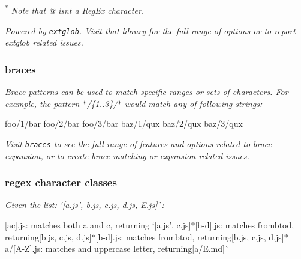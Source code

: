 {\itshape \textsuperscript{{\bfseries $\ast$}} Note that {\ttfamily @} isn\textquotesingle{}t a Reg\+Ex character.}

{\itshape Powered by \href{https://github.com/micromatch/extglob}{\tt extglob}. Visit that library for the full range of options or to report extglob related issues.}

{\itshape \subsubsection*{braces}}

{\itshape }

{\itshape Brace patterns can be used to match specific ranges or sets of characters. For example, the pattern {\ttfamily $\ast$/\{1..3\}/$\ast$} would match any of following strings\+:}

{\itshape 
\begin{DoxyCode}
foo/1/bar
foo/2/bar
foo/3/bar
baz/1/qux
baz/2/qux
baz/3/qux
\end{DoxyCode}
}

{\itshape Visit \href{https://github.com/micromatch/braces}{\tt braces} to see the full range of features and options related to brace expansion, or to create brace matching or expansion related issues.}

{\itshape \subsubsection*{regex character classes}}

{\itshape }

{\itshape Given the list\+: `\mbox{[}\textquotesingle{}a.\+js', \textquotesingle{}b.\+js\textquotesingle{}, \textquotesingle{}c.\+js\textquotesingle{}, \textquotesingle{}d.\+js\textquotesingle{}, \textquotesingle{}E.\+js\textquotesingle{}\mbox{]}\`{}\+:}

{\itshape 
\begin{DoxyItemize}
\item {\ttfamily \mbox{[}ac\mbox{]}.js}\+: matches both {\ttfamily a} and {\ttfamily c}, returning `\mbox{[}\textquotesingle{}a.\+js', \textquotesingle{}c.\+js\textquotesingle{}\mbox{]}{\ttfamily  $\ast$}\mbox{[}b-\/d\mbox{]}.js{\ttfamily \+: matches from}b{\ttfamily to}d{\ttfamily , returning}\mbox{[}\textquotesingle{}b.\+js\textquotesingle{}, \textquotesingle{}c.\+js\textquotesingle{}, \textquotesingle{}d.\+js\textquotesingle{}\mbox{]}{\ttfamily  $\ast$}\mbox{[}b-\/d\mbox{]}.js{\ttfamily \+: matches from}b{\ttfamily to}d{\ttfamily , returning}\mbox{[}\textquotesingle{}b.\+js\textquotesingle{}, \textquotesingle{}c.\+js\textquotesingle{}, \textquotesingle{}d.\+js\textquotesingle{}\mbox{]}{\ttfamily  $\ast$}a/\mbox{[}A-\/Z\mbox{]}.js{\ttfamily \+: matches and uppercase letter, returning}\mbox{[}\textquotesingle{}a/\+E.\+md\textquotesingle{}\mbox{]}\`{}
\end{DoxyItemize}}

